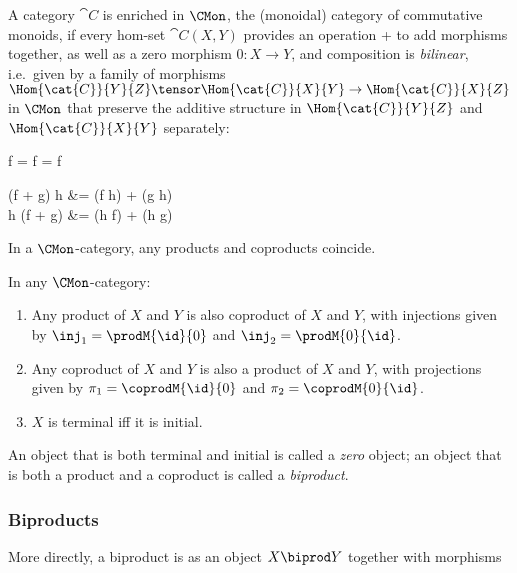 A category $\cat{C}$ is enriched in $\CMon$, the (monoidal) category of commutative monoids, if every hom-set
$\cat{C}(X,Y)$ provides an operation + to add morphisms together, as well as a zero morphism $0: X \to Y$, and
composition is \emph{bilinear}, i.e.~given by a family of morphisms $\Hom{\cat{C}}{Y}{Z} \tensor
\Hom{\cat{C}}{X}{Y} \to \Hom{\cat{C}}{X}{Z}$ in $\CMon$ that preserve the additive structure in
$\Hom{\cat{C}}{Y}{Z}$ and $\Hom{\cat{C}}{X}{Y}$ separately:

\begin{salign*}
f \comp \zero = f = \zero \comp f
\end{salign*}
\begin{salign*}
(f + g) \comp h &= (f \comp h) + (g \comp h) \\
h \comp (f + g) &= (h \comp f) + (h \comp g)
\end{salign*}

In a $\CMon$-category, any products and coproducts coincide.

\begin{proposition}
\label{prop:biproducts:from-product-or-coproduct}
In any $\CMon$-category:
\begin{enumerate}
\item Any product of $X$ and $Y$ is also coproduct of $X$ and $Y$, with injections given by $\inj_1 =
\prodM{\id}{0}$ and $\inj_2 = \prodM{0}{\id}$.
\item Any coproduct of $X$ and $Y$  is also a product of $X$ and $Y$, with projections given by $\pi_1 =
\coprodM{\id}{0}$ and $\pi_2 = \coprodM{0}{\id}$.
\item $X$ is terminal iff it is initial.
\end{enumerate}
\end{proposition}

An object that is both terminal and initial is called a \emph{zero} object; an object that is both a product
and a coproduct is called a \emph{biproduct}.

\subsubsection{Biproducts}

More directly, a biproduct is as an object $X \biprod Y$ together with morphisms

\begin{center}
\end{center}

